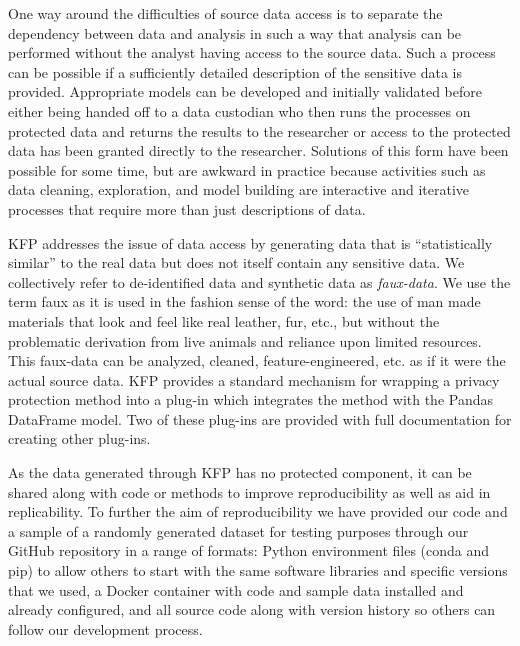 \documentclass{amia}
\begin{document}
One way around the difficulties of source data access is to separate the dependency between data and analysis in such a way that analysis can be performed without the analyst having access to the source data. Such a process can be possible if a sufficiently detailed description of the sensitive data is provided. Appropriate models can be developed and initially validated before either being handed off to a data custodian who then runs the processes on protected data and returns the results to the researcher or access to the protected data has been granted directly to the researcher. Solutions of this form have been possible for some time, but are awkward in practice because activities such as data cleaning, exploration, and model building are interactive and iterative processes that require more than just descriptions of data.

KFP addresses the issue of data access by generating data that is ``statistically similar'' to the real data but does not itself contain any sensitive data. We collectively refer to de-identified data and synthetic data as \emph{faux-data}. We use the term faux as it is used in the fashion sense of the word: the use of man made materials that look and feel like real leather, fur, etc., but without the problematic derivation from live animals and reliance upon limited resources. This faux-data can be analyzed, cleaned, feature-engineered, etc. as if it were the actual source data. KFP provides a standard mechanism for wrapping a privacy protection method into a plug-in which integrates the method with the Pandas DataFrame model. Two of these plug-ins are provided with full documentation for creating other plug-ins.

As the data generated through KFP has no protected component, it can be shared along with code or methods to improve reproducibility as well as aid in replicability. To further the aim of reproducibility we have provided our code and a sample of a randomly generated dataset for testing purposes through our GitHub repository in a range of formats: Python environment files (conda and pip) to allow others to start with the same software libraries and specific versions that we used, a Docker container with code and sample data installed and already configured, and all source code along with version history so others can follow our development process.
\end{document}
